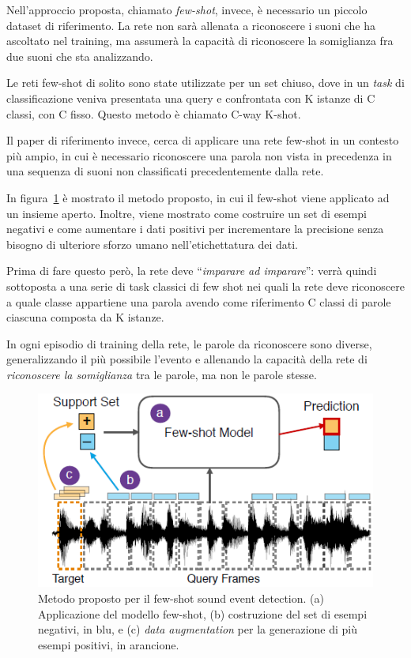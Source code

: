 \documentclass[12pt,a4paper,titlepage]{article}
\begin{document}
Nell'approccio proposta, chiamato \textit{few-shot}, invece, è necessario un piccolo dataset di riferimento. La rete non sarà allenata a riconoscere i suoni che ha ascoltato nel training, ma assumerà la capacità di riconoscere la somiglianza fra due suoni che sta analizzando.

Le reti few-shot di solito sono state utilizzate per un set chiuso, dove in un \textit{task} di classificazione veniva presentata una query e confrontata con K istanze di C classi, con C fisso.
Questo metodo è chiamato C-way K-shot.

Il paper di riferimento invece, cerca di applicare una rete few-shot in un contesto più ampio, in cui è necessario riconoscere una parola non vista in precedenza in una sequenza di suoni non classificati precedentemente dalla rete.

In figura~\ref{fig:few_shot_sound_event_detection_method} è mostrato il metodo proposto, in cui il few-shot viene applicato ad un insieme aperto. Inoltre, viene mostrato come costruire un set di esempi negativi e come aumentare i dati positivi per incrementare la precisione senza bisogno di ulteriore sforzo umano nell'etichettatura dei dati.

Prima di fare questo però, la rete deve ``\textit{imparare ad imparare}'': verrà quindi sottoposta a una serie di task classici di few shot nei quali la rete deve riconoscere a quale classe appartiene una parola avendo come riferimento C classi di parole ciascuna composta da K istanze.

In ogni episodio di training della rete, le parole da riconoscere sono diverse, generalizzando il più possibile l'evento e allenando la capacità della rete di \textit{riconoscere la somiglianza} tra le parole, ma non le parole stesse.

\begin{figure}[h]
	\centering	
	\includegraphics[width=.7\textwidth]{Immagini/few_shot_sound_event_detection_method}
	\caption{Metodo proposto per il few-shot sound event detection. (a) Applicazione del modello few-shot, (b) costruzione del set di esempi negativi, in blu, e (c) \textit{data augmentation} per la generazione di più esempi positivi, in arancione.~\cite{Salamon:Few-Shot}}
	\label{fig:few_shot_sound_event_detection_method}
\end{figure}
\end{document}
